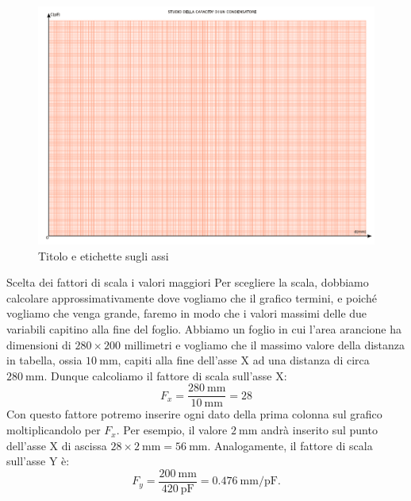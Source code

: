 \documentclass[12pt,a4paper,oneside]{book}
\makeatletter
\renewcommand{\subsection}{\@startsection {subsection}{2}{\z@}
{-3ex \@plus -0.1ex \@minus -.4ex}
{0.5ex \@plus.2ex }
{\color[rgb]{0.141,0.596,0.749}\normalfont\sffamily\bfseries}}
\theoremstyle{esercizio}
\makeatother
\begin{document}
   \begin{figure}[h!]
    \centering
    \includegraphics[width=\linewidth]{img/titoloassi.pdf} 
    \caption{Titolo e  etichette sugli assi}
    \label{fig:titoloassi}
\end{figure}  

\subsection{Scelta dei fattori di scala i valori maggiori} 
Per scegliere la scala, dobbiamo calcolare approssimativamente dove vogliamo che il grafico termini, e poiché vogliamo che venga grande, faremo in modo che i valori massimi delle due variabili capitino alla fine del foglio. Abbiamo un foglio in cui l'area arancione ha   dimensioni di $280 \times 200 $ millimetri e vogliamo che il massimo valore della distanza in tabella, ossia $\SI{10}{\milli\meter}$, capiti alla fine dell'asse X ad una distanza di circa $\SI{280}{\milli\meter}$. Dunque calcoliamo il fattore di scala sull'asse X:
\[
F_x=\frac{\SI{280}{\milli\meter}}{\SI{10}{\milli\meter}} = 28
\]
Con questo fattore potremo inserire ogni dato della prima colonna sul grafico moltiplicandolo per $F_x$. Per esempio, il valore $\SI{2}{\milli\meter}$ andrà inserito sul punto dell'asse X di ascissa $28\times\SI{2}{\milli\meter} = \SI{56}{\milli\meter}$. Analogamente, il fattore di scala sull'asse Y è:
\[
F_y = \frac{\SI{200}{\milli\meter}}{\SI{420}{\pico\farad}} = \SI{0,476}{\milli\meter\per\pico\farad}.
\] 
\end{document}
